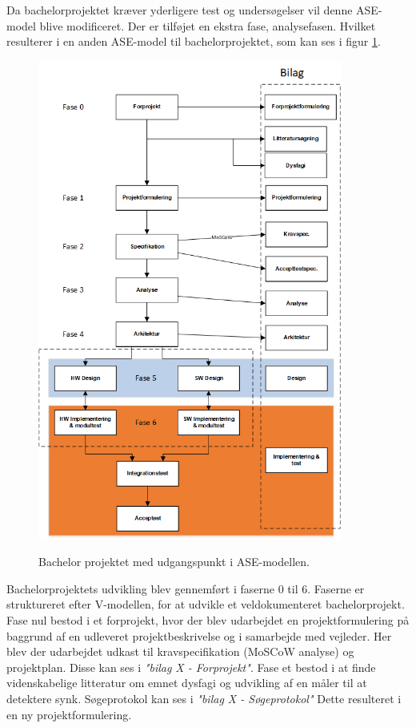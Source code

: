 Da bachelorprojektet kræver yderligere test og undersøgelser vil denne ASE-model blive modificeret. Der er tilføjet en ekstra fase, analysefasen. Hvilket resulterer i en anden ASE-model til bachelorprojektet, som kan ses i figur \ref{procesVoresASE}.


\begin{figure}[H] 
\centering
{\includegraphics[width=10cm]
{Figure/procesVoresASE}}
\caption{Bachelor projektet med udgangspunkt i ASE-modellen.}
\label{procesVoresASE}
\end{figure}

Bachelorprojektets udvikling blev gennemført i faserne 0 til 6. Faserne er struktureret efter V-modellen\cite{IngeniorhojskolenAarhusUniversiteta}, for at udvikle et veldokumenteret bachelorprojekt. Fase nul bestod i et forprojekt, hvor der blev udarbejdet en projektformulering på baggrund af en udleveret projektbeskrivelse og i samarbejde med vejleder. Her blev der udarbejdet udkast til kravspecifikation (MoSCoW analyse) og projektplan. Disse kan ses i \textit{"bilag X - Forprojekt"}. Fase et bestod i at finde videnskabelige litteratur om emnet dysfagi og udvikling af en måler til at detektere synk. Søgeprotokol kan ses i \textit{"bilag X - Søgeprotokol"} Dette resulteret i en ny projektformulering.

